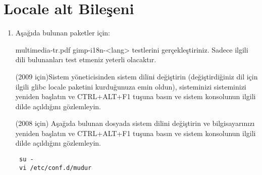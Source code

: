 \documentclass[a4paper,10pt]{article}
\begin{document}
\section{Locale alt Bileşeni}
\begin{enumerate}
 \item Aşağıda bulunan paketler için:

multimedia-tr.pdf gimp-i18n-<lang> testlerini gerçekleştiriniz. Sadece ilgili dili bulunanları test etmeniz yeterli olacaktır.

(2009 için)Sistem yöneticisinden sistem dilini değiştirin (değiştirdiğiniz dil için ilgili glibc locale paketini kurduğunuza emin oldun), sisteminizi sisteminizi yeniden başlatın ve CTRL+ALT+F1 tuşuna basın ve sistem konsolunun ilgili dilde açıldığını gözlemleyin.

(2008 için) Aşağıda bulunan dosyada sistem dilini değiştirin ve bilgisayarınızı yeniden başlatın ve CTRL+ALT+F1 tuşuna basın ve sistem konsolunun ilgili dilde açıldığını gözlemleyin.
\begin{verbatim}
 su -
 vi /etc/conf.d/mudur
\end{verbatim}


\end{enumerate}
\end{document}
